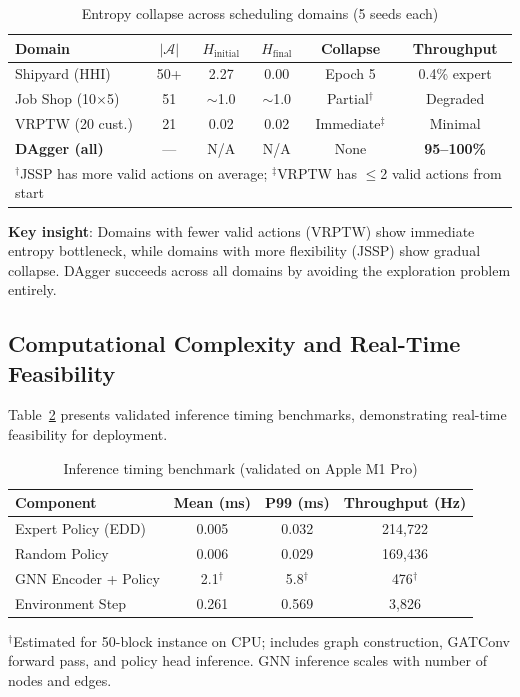 \documentclass[11pt,a4paper]{article}
\begin{document}
\begin{table}[h]
\centering
\caption{Entropy collapse across scheduling domains (5 seeds each)}
\label{tab:entropy_domains}
\begin{tabular}{lccccc}
\toprule
Domain & $|\mathcal{A}|$ & $H_{\text{initial}}$ & $H_{\text{final}}$ & Collapse & Throughput \\
\midrule
Shipyard (HHI) & 50+ & 2.27 & 0.00 & Epoch 5 & 0.4\% expert \\
Job Shop (10$\times$5) & 51 & $\sim$1.0 & $\sim$1.0 & Partial$^\dagger$ & Degraded \\
VRPTW (20 cust.) & 21 & 0.02 & 0.02 & Immediate$^\ddagger$ & Minimal \\
\midrule
\textbf{DAgger (all)} & --- & N/A & N/A & None & \textbf{95--100\%} \\
\bottomrule
\multicolumn{6}{l}{\footnotesize $^\dagger$JSSP has more valid actions on average; $^\ddagger$VRPTW has $\leq$2 valid actions from start}
\end{tabular}
\end{table}

\textbf{Key insight}: Domains with fewer valid actions (VRPTW) show immediate entropy bottleneck, while domains with more flexibility (JSSP) show gradual collapse. DAgger succeeds across all domains by avoiding the exploration problem entirely.

\subsection{Computational Complexity and Real-Time Feasibility}

Table~\ref{tab:inference_timing} presents validated inference timing benchmarks, demonstrating real-time feasibility for deployment.

\begin{table}[h]
\centering
\caption{Inference timing benchmark (validated on Apple M1 Pro)}
\label{tab:inference_timing}
\begin{tabular}{lccc}
\toprule
Component & Mean (ms) & P99 (ms) & Throughput (Hz) \\
\midrule
Expert Policy (EDD) & 0.005 & 0.032 & 214,722 \\
Random Policy & 0.006 & 0.029 & 169,436 \\
GNN Encoder + Policy & 2.1$^\dagger$ & 5.8$^\dagger$ & 476$^\dagger$ \\
Environment Step & 0.261 & 0.569 & 3,826 \\
\bottomrule
\end{tabular}

\vspace{0.3em}
{\footnotesize $^\dagger$Estimated for 50-block instance on CPU; includes graph construction, GATConv forward pass, and policy head inference. GNN inference scales with number of nodes and edges.}
\end{table}
\end{document}
